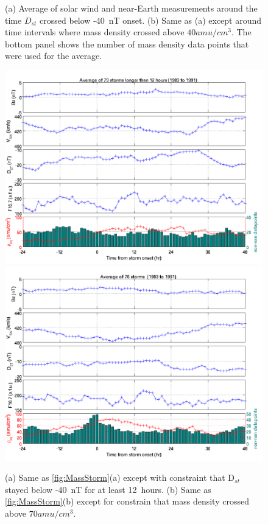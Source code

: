 \documentclass[10pt,twocolumn]{article}
\begin{document}
\begin{figure}[htp!]
\caption{(a) Average of solar wind and near-Earth measurements around the time $D_{st}$ crossed below -40~nT onset. (b) Same as (a) except around time intervals where mass density crossed above $40 amu/cm^3$.  The bottom panel shows the number of mass density data points that were used for the average.}
\label{MassStorm}
\end{figure}
\clearpage

\begin{figure}[htp!]
\centering
\includegraphics[scale=0.7]{paperfigures/stormavs-md12.png}
\includegraphics[scale=0.7]{paperfigures/stormavs-m70.png}
\caption{(a) Same as \ref{fig:MassStorm}(a) except with constraint that D$_{st}$ stayed below -40~nT for at least 12~hours. (b) Same as \ref{fig:MassStorm}(b) except for constrain that mass density crossed above $70 amu/cm^3$.}
\label{Mspec}
\end{figure}
\clearpage
\end{document}
